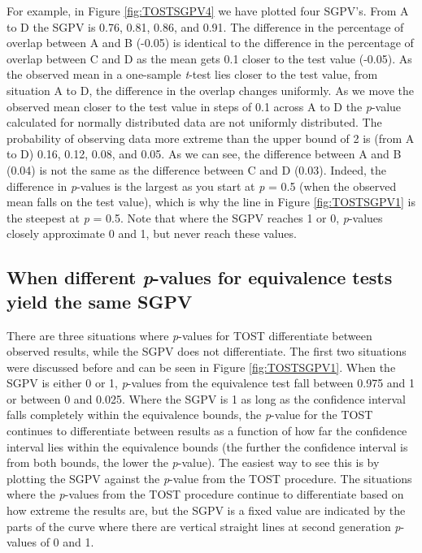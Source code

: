 \documentclass[,man,floatsintext]{apa6}
\begin{document}
For example, in Figure \ref{fig:TOSTSGPV4} we have plotted four SGPV's.
From A to D the SGPV is 0.76, 0.81, 0.86, and 0.91. The difference in
the percentage of overlap between A and B (-0.05) is identical to the
difference in the percentage of overlap between C and D as the mean gets
0.1 closer to the test value (-0.05). As the observed mean in a
one-sample \emph{t}-test lies closer to the test value, from situation A
to D, the difference in the overlap changes uniformly. As we move the
observed mean closer to the test value in steps of 0.1 across A to D the
\emph{p}-value calculated for normally distributed data are not
uniformly distributed. The probability of observing data more extreme
than the upper bound of 2 is (from A to D) 0.16, 0.12, 0.08, and 0.05.
As we can see, the difference between A and B (0.04) is not the same as
the difference between C and D (0.03). Indeed, the difference in
\emph{p}-values is the largest as you start at \emph{p} = 0.5 (when the
observed mean falls on the test value), which is why the line in Figure
\ref{fig:TOSTSGPV1} is the steepest at \emph{p} = 0.5. Note that where
the SGPV reaches 1 or 0, \emph{p}-values closely approximate 0 and 1,
but never reach these values.

\subsection{\texorpdfstring{When different \emph{p}-values for
equivalence tests yield the same
SGPV}{When different p-values for equivalence tests yield the same SGPV}}\label{when-different-p-values-for-equivalence-tests-yield-the-same-sgpv}

There are three situations where \emph{p}-values for TOST differentiate
between observed results, while the SGPV does not differentiate. The
first two situations were discussed before and can be seen in Figure
\ref{fig:TOSTSGPV1}. When the SGPV is either 0 or 1, \emph{p}-values
from the equivalence test fall between 0.975 and 1 or between 0 and
0.025. Where the SGPV is 1 as long as the confidence interval falls
completely within the equivalence bounds, the \emph{p}-value for the
TOST continues to differentiate between results as a function of how far
the confidence interval lies within the equivalence bounds (the further
the confidence interval is from both bounds, the lower the
\emph{p}-value). The easiest way to see this is by plotting the SGPV
against the \emph{p}-value from the TOST procedure. The situations where
the \emph{p}-values from the TOST procedure continue to differentiate
based on how extreme the results are, but the SGPV is a fixed value are
indicated by the parts of the curve where there are vertical straight
lines at second generation \emph{p}-values of 0 and 1.
\end{document}

